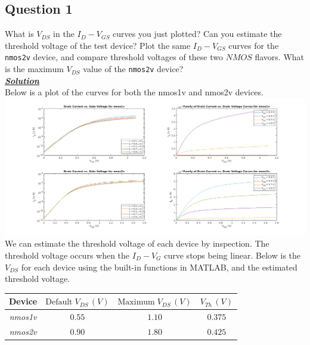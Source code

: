 \documentclass[12pt, fleqn]{article}
\begin{document}
\subsection{Question 1}
What is $V_{DS}$ in the $I_D - V_{GS}$ curves you just plotted? Can you estimate the threshold voltage of the test device? Plot the same $I_D - V_{GS}$ curves for the \texttt{nmos2v} device, and compare threshold voltages of these two $NMOS$ flavors. What is the maximum $V_{DS}$ value of the \texttt{nmos2v} device?\\[0.5cm]
\underline{\textbf{\textit{Solution}}}\\[0.25cm]
Below is a plot of the curves for both the nmos1v and nmos2v devices.\\
\includegraphics[scale=0.45, center]{plot1.PNG}\\
We can estimate the threshold voltage of each device by inspection.  The threshold voltage occurs when the $I_D - V_G$ curve stops being linear.
Below is the $V_{DS}$ for each device using the built-in functions in MATLAB, and the estimated threshold voltage.\\[0.25cm]
    \begin{table}[H]
    \centering
    \setlength{\tabcolsep}{20pt}
    \renewcommand{\arraystretch}{1.5}
        \begin{tabular}{|c|c|c|c|}
            \hline
            \textbf{Device} & $\text{Default}\;V_{DS}\,(V)$ & $\text{Maximum}\;V_{DS}\,(V)$ & $V_{Th}\,(V)$\\
            \hline
            \textit{nmos1v} & $0.55$ & $1.10$ & $0.375$\\
            \hline
            \textit{nmos2v} & $0.90$ & $1.80$ & $0.425$\\
            \hline
        \end{tabular}
    \end{table}
\newpage
\end{document}
